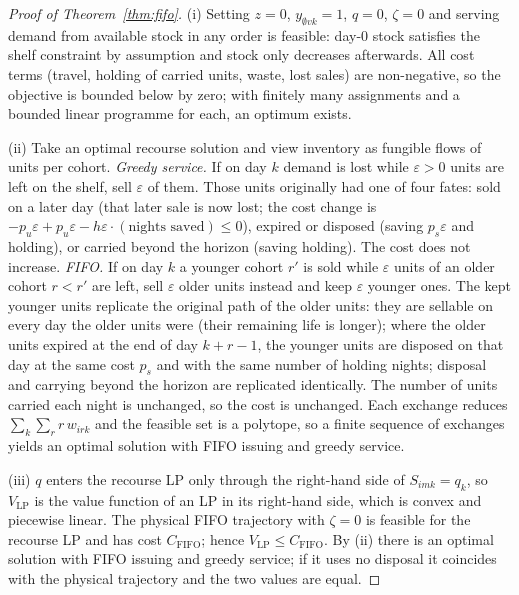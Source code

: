 \begin{proof}[Proof of Theorem~\ref{thm:fifo}]
(i) Setting $z=0$, $y_{\emptyset vk}=1$, $q=0$, $\zeta=0$ and serving demand from available stock in any order is feasible: day-0 stock satisfies the shelf constraint by assumption and stock only decreases afterwards. All cost terms (travel, holding of carried units, waste, lost sales) are non-negative, so the objective is bounded below by zero; with finitely many assignments and a bounded linear programme for each, an optimum exists.

(ii) Take an optimal recourse solution and view inventory as fungible flows of units per cohort. \emph{Greedy service.} If on day $k$ demand is lost while $\varepsilon>0$ units are left on the shelf, sell $\varepsilon$ of them. Those units originally had one of four fates: sold on a later day (that later sale is now lost; the cost change is $-p_u\varepsilon+p_u\varepsilon-h\varepsilon\cdot(\text{nights saved})\le0$), expired or disposed (saving $p_s\varepsilon$ and holding), or carried beyond the horizon (saving holding). The cost does not increase. \emph{FIFO.} If on day $k$ a younger cohort $r'$ is sold while $\varepsilon$ units of an older cohort $r<r'$ are left, sell $\varepsilon$ older units instead and keep $\varepsilon$ younger ones. The kept younger units replicate the original path of the older units: they are sellable on every day the older units were (their remaining life is longer); where the older units expired at the end of day $k+r-1$, the younger units are disposed on that day at the same cost $p_s$ and with the same number of holding nights; disposal and carrying beyond the horizon are replicated identically. The number of units carried each night is unchanged, so the cost is unchanged. Each exchange reduces $\sum_k\sum_r r\,w_{irk}$ and the feasible set is a polytope, so a finite sequence of exchanges yields an optimal solution with FIFO issuing and greedy service.

(iii) $q$ enters the recourse LP only through the right-hand side of $S_{imk}=q_k$, so $V_{\mathrm{LP}}$ is the value function of an LP in its right-hand side, which is convex and piecewise linear. The physical FIFO trajectory with $\zeta=0$ is feasible for the recourse LP and has cost $C_{\mathrm{FIFO}}$; hence $V_{\mathrm{LP}}\le C_{\mathrm{FIFO}}$. By (ii) there is an optimal solution with FIFO issuing and greedy service; if it uses no disposal it coincides with the physical trajectory and the two values are equal.
\end{proof}

